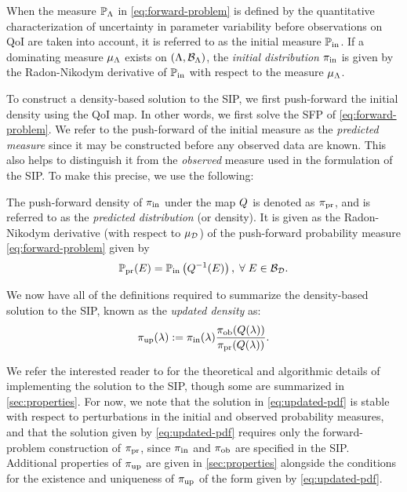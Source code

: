 \begin{defn}\label{defn:initial}
  When the measure $\mathbb{P}_{\Lambda}$ in \eqref{eq:forward-problem} is defined by the quantitative characterization of uncertainty in parameter variability before observations on QoI are taken into account, it is referred to as the initial measure $\operatorname*{\mathbb{P}_{in}}$.
  If a dominating measure $\mu_{\Lambda}$ exists on $({\Lambda}, \mathcal{B}_{{\Lambda}})$, the \emph{initial distribution} $\operatorname*{\pi_{in}}$ is given by the Radon-Nikodym derivative of $\operatorname*{\mathbb{P}_{in}}$ with respect to the measure $\mu_{{\Lambda}}$.
\end{defn}


To construct a density-based solution to the SIP, we first push-forward the initial density using the QoI map.
In other words, we first solve the SFP of \eqref{eq:forward-problem}.
We refer to the push-forward of the initial measure as the \emph{predicted measure} since it may be constructed before any observed data are known.
This also helps to distinguish it from the {\em observed} measure used in the formulation of the SIP.
To make this precise, we use the following:

\begin{defn}\label{defn:predicted}
  The push-forward density of $\operatorname*{\pi_{in}}$ under the map $Q$ is denoted as $\operatorname*{\pi_{pr}}$, and is referred to as the \emph{predicted distribution} (or density).
  It is given as the Radon-Nikodym derivative (with respect to $\mu_{\mathcal{D}}$) of the push-forward probability measure \eqref{eq:forward-problem} given by
  \begin{equation}\label{eq:predicted}
    \operatorname*{\mathbb{P}_{pr}} (E) = \operatorname*{\mathbb{P}_{in}} \left ( Q^{-1}(E) \right ), \; \forall \; E \in \mathcal{B}_{\mathcal{D}}.
  \end{equation}
\end{defn}

We now have all of the definitions required to summarize the density-based solution to the SIP, known as the \emph{updated density} as:
\begin{equation}\label{eq:updated-pdf}
	\operatorname*{\pi_{up}}(\lambda) := \operatorname*{\pi_{in}}(\lambda)\frac{\operatorname*{\pi_{ob}}(Q(\lambda))}{\operatorname*{\pi_{pr}}(Q(\lambda))}.
\end{equation}

We refer the interested reader to \cite{BJW18a} for the theoretical and algorithmic details of implementing the solution to the SIP, though some are summarized in \ref{sec:properties}.
For now, we note that the solution in \eqref{eq:updated-pdf} is stable with respect to perturbations in the initial and observed probability measures, and that the solution given by \eqref{eq:updated-pdf} requires only the forward-problem construction of $\operatorname*{\pi_{pr}}$, since $\operatorname*{\pi_{in}}$ and $\operatorname*{\pi_{ob}}$ are specified in the SIP.
Additional properties of $\operatorname*{\pi_{up}}$ are given in \ref{sec:properties} alongside the conditions for the existence and uniqueness of $\operatorname*{\pi_{up}}$ of the form given by \eqref{eq:updated-pdf}.

